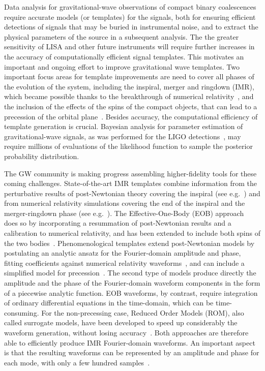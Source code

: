 \documentclass[aps,showpacs,twocolumn,
prd,superscriptaddress,nofootinbib]{revtex4-1}
\begin{document}
Data analysis for gravitational-wave observations of compact binary coalescences require accurate models (or templates) for the signals, both for ensuring efficient detections of signals that may be buried in instrumental noise, and to extract the physical parameters of the source in a subsequent analysis. The the greater sensitivity of LISA and other future instruments will require further increases in the accuracy of computationally efficient signal templates. This motivates an important and ongoing effort to improve gravitational wave templates. Two important focus areas for template improvements are need to cover all phases of the evolution of the system, including the inspiral, merger and ringdown (IMR), which became possible thanks to the breakthrough of numerical relativity~\cite{Pretorius05,Baker+06,Campanelli+06}, and the inclusion of the effects of the spins of the compact objects, that can lead to a precession of the orbital plane~\cite{ACST94,K95}. Besides accuracy, the computational efficiency of template generation is crucial. Bayesian analysis for parameter estimation of gravitational-wave signals, as was performed for the LIGO detections~\cite{LIGO-theeventPE-2016,LIGO-O1BBH-2016}, may require millions of evaluations of the likelihood function to sample the posterior probability distribution.  

The GW community is making progress assembling higher-fidelity tools for these coming challenges.
State-of-the-art IMR templates combine information from the perturbative results of post-Newtonian theory covering the inspiral (see e.g.~\cite{BlanchetLiving}) and from numerical relativity simulations covering the end of the inspiral and the merger-ringdown phase (see e.g.~\cite{Pfeiffer12}). The Effective-One-Body (EOB) approach~\cite{BD99} does so by incorporating a resummation of post-Newtonian results and a calibration to numerical relativity, and has been extended to include both spins of the two bodies~\cite{Taracchini+13, Pan+13, Bohe+16}. Phenomenological templates extend post-Newtonian models by postulating an analytic ansatz for the Fourier-domain amplitude and phase, fitting coefficients against numerical relativity waveforms~\cite{Husa+15, Khan+15}, and can include a simplified model for precession~\cite{Hannam+13}. The second type of models produce directly the amplitude and the phase of the Fourier-domain waveform components in the form of a piecewise analytic function. EOB waveforms, by contrast, require integration of ordinary differential equations in the time-domain, which can be time-consuming. For the non-precessing case, Reduced Order Models (ROM), also called surrogate models, have been developed to speed up considerably the waveform generation, without losing accuracy~\cite{Field+13, Puerrer14, Bohe+16}. Both approaches are therefore able to efficiently produce IMR Fourier-domain waveforms. An important aspect is that the resulting waveforms can be represented by an amplitude and phase for each mode, with only a few hundred samples~\cite{Puerrer14}.
\end{document}
